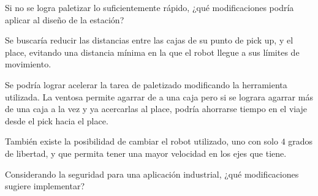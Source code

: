 \documentclass[a4paper,11pt]{article}
\begin{document}
\begin{center}
    \begin{tcolorbox}[colback=blue!10,colframe=blue!50!black]
        \centering
        Si no se logra paletizar lo suficientemente rápido, ¿qué modificaciones podría aplicar al diseño de la estación?
    \end{tcolorbox}
\end{center}

Se buscaría reducir las distancias entre las cajas de su punto de pick up, y el place, evitando una distancia mínima en la que el robot llegue a sus límites de movimiento.

Se podría lograr acelerar la tarea de paletizado modificando la herramienta utilizada. La ventosa permite agarrar de a una caja pero si se lograra agarrar más de una caja a la vez y ya acercarlas al place, podría ahorrarse tiempo en el viaje desde el pick hacia el place. 

También existe la posibilidad de cambiar el robot utilizado, uno con solo $4$ grados de libertad, y que permita tener una mayor velocidad en los ejes que tiene.

\begin{center}
    \begin{tcolorbox}[colback=blue!10,colframe=blue!50!black]
        \centering
        Considerando la seguridad para una aplicación industrial, ¿qué modificaciones sugiere implementar?
    \end{tcolorbox}
\end{center}
\end{document}
